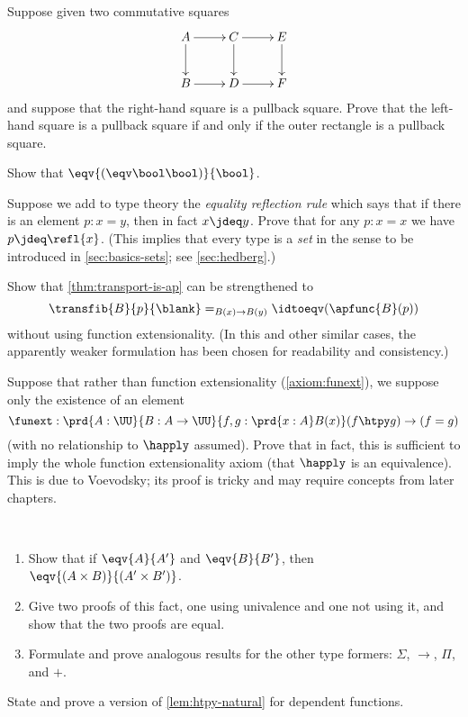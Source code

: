 \begin{ex}\label{ex:pullback-pasting}
  Suppose given two commutative squares
  \begin{equation*}
    \vcenter{\xymatrix{
        A\ar[r]\ar[d] &
        C\ar[r]\ar[d] &
        E\ar[d]\\
        B\ar[r] &
        D\ar[r] &
        F
      }}
  \end{equation*}
  and suppose that the right-hand square is a pullback square.
  Prove that the left-hand square is a pullback square if and only if the outer rectangle is a pullback square.
\end{ex}

\begin{ex}\label{ex:eqvboolbool}
  Show that $\eqv{(\eqv\bool\bool)}{\bool}$.
\end{ex}

\begin{ex}\label{ex:equality-reflection}
  Suppose we add to type theory the \emph{equality reflection rule} which says that if there is an element $p:x=y$, then in fact $x\jdeq y$.
  Prove that for any $p:x=x$ we have $p\jdeq \refl{x}$.
  (This implies that every type is a \emph{set} in the sense to be introduced in \cref{sec:basics-sets}; see \cref{sec:hedberg}.)
\end{ex}

\begin{ex}\label{ex:strengthen-transport-is-ap}
  Show that \cref{thm:transport-is-ap} can be strengthened to
  \[\transfib{B}{p}{{\blank}} =_{B(x)\to B(y)} \idtoeqv(\apfunc{B}(p))\]
  without using function extensionality.
  (In this and other similar cases, the apparently weaker formulation has been chosen for readability and consistency.)
\end{ex}

\begin{ex}\label{ex:strong-from-weak-funext}
  Suppose that rather than function extensionality (\cref{axiom:funext}), we suppose only the existence of an element
  \[ \funext : \prd{A:\UU}{B:A\to \UU}{f,g:\prd{x:A} B(x)} (f\htpy g) \to (f=g) \]
  (with no relationship to $\happly$ assumed).
  Prove that in fact, this is sufficient to imply the whole function extensionality axiom (that $\happly$ is an equivalence).
  This is due to Voevodsky; its proof is tricky and may require concepts from later chapters.
\end{ex}

\begin{ex}\label{ex:equiv-functor-types}\
  \begin{enumerate}
  \item Show that if $\eqv{A}{A'}$  and $\eqv{B}{B'}$, then $\eqv{(A\times B)}{(A'\times B')}$.
  \item Give two proofs of this fact, one using univalence and one not using it, and show that the two proofs are equal.
  \item Formulate and prove analogous results for the other type formers: $\Sigma$, $\to$, $\Pi$, and $+$.
\end{enumerate}
\end{ex}

\begin{ex}\label{ex:dep-htpy-natural}
  State and prove a version of \cref{lem:htpy-natural} for dependent functions.
\end{ex}

